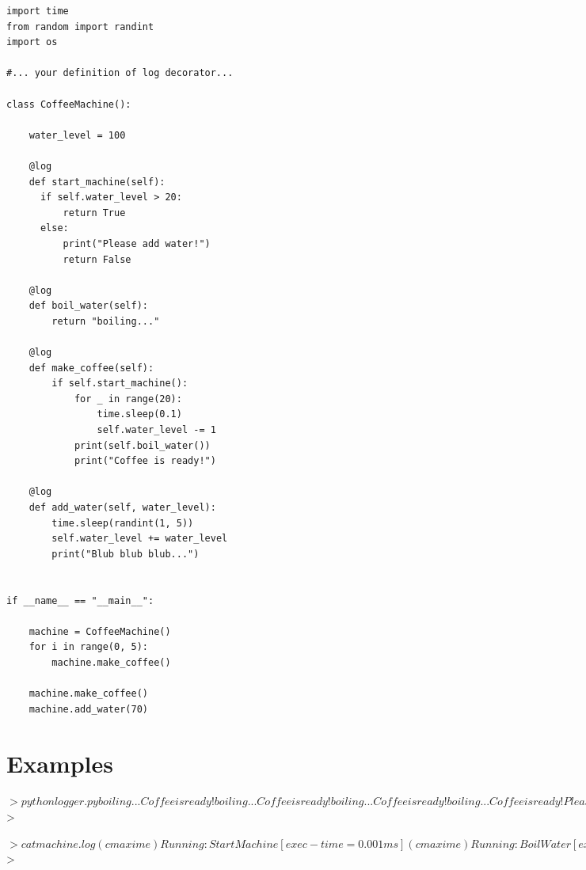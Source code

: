 \documentclass{42-en}
\begin{document}
\begin{verbatim}
import time
from random import randint
import os

#... your definition of log decorator...

class CoffeeMachine():

	water_level = 100

	@log
	def start_machine(self):
	  if self.water_level > 20:
		  return True
	  else:
		  print("Please add water!")
		  return False
	
	@log
	def boil_water(self):
		return "boiling..."
	
	@log
	def make_coffee(self):
		if self.start_machine():
			for _ in range(20):
				time.sleep(0.1)
				self.water_level -= 1
			print(self.boil_water())
			print("Coffee is ready!")
	
	@log
	def add_water(self, water_level):
		time.sleep(randint(1, 5))
		self.water_level += water_level
		print("Blub blub blub...")


if __name__ == "__main__":
	
	machine = CoffeeMachine()
	for i in range(0, 5):
		machine.make_coffee()

	machine.make_coffee()
	machine.add_water(70)
\end{verbatim}

\section*{Examples}
\begin{42console}
  $> python logger.py
  boiling...
  Coffee is ready!
  boiling...
  Coffee is ready!
  boiling...
  Coffee is ready!
  boiling...
  Coffee is ready!
  Please add water!
  Please add water!
  Blub blub blub...
  $>
\end{42console}

\begin{42console}
  $> cat machine.log
  (cmaxime)Running: Start Machine      [ exec-time = 0.001 ms ]
  (cmaxime)Running: Boil Water         [ exec-time = 0.005 ms ]
  (cmaxime)Running: Make Coffee        [ exec-time = 2.499 s  ]
  (cmaxime)Running: Start Machine      [ exec-time = 0.002 ms ]
  (cmaxime)Running: Boil Water         [ exec-time = 0.005 ms ]
  (cmaxime)Running: Make Coffee        [ exec-time = 2.618 s  ]
  (cmaxime)Running: Start Machine      [ exec-time = 0.003 ms ]
  (cmaxime)Running: Boil Water         [ exec-time = 0.004 ms ]
  (cmaxime)Running: Make Coffee        [ exec-time = 2.676 s  ]
  (cmaxime)Running: Start Machine      [ exec-time = 0.003 ms ]
  (cmaxime)Running: Boil Water         [ exec-time = 0.004 ms ]
  (cmaxime)Running: Make Coffee        [ exec-time = 2.648 s  ]
  (cmaxime)Running: Start Machine      [ exec-time = 0.011 ms ]
  (cmaxime)Running: Make Coffee        [ exec-time = 0.029 ms ]
  (cmaxime)Running: Start Machine      [ exec-time = 0.009 ms ]
  (cmaxime)Running: Make Coffee        [ exec-time = 0.024 ms ]
  (cmaxime)Running: Add Water          [ exec-time = 5.026 s  ]
  $>
\end{42console}
\end{document}
